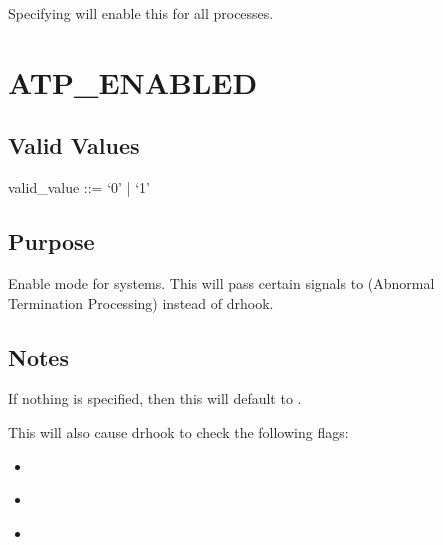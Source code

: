\documentclass[letterpaper,10pt,english]{sphinxmanual}
\begin{document}
\sphinxAtStartPar
Specifying  will enable this for all processes.


\section{ATP\_ENABLED}
\label{\detokenize{flag/flag:atp-enabled}}\label{\detokenize{flag/flag:id39}}

\subsection{Valid Values}
\label{\detokenize{flag/flag:id40}}
\begin{DUlineblock}{0em}
\item[] valid\_value ::= ‘0’ | ‘1’
\end{DUlineblock}


\subsection{Purpose}
\label{\detokenize{flag/flag:id41}}
\sphinxAtStartPar
Enable  mode for  systems. This will pass certain signals to  (Abnormal Termination Processing) instead of drhook.


\subsection{Notes}
\label{\detokenize{flag/flag:id42}}
\sphinxAtStartPar
If nothing is specified, then this will default to .

\sphinxAtStartPar
This will also cause drhook to check the following flags:
\begin{itemize}
\item {} 
\sphinxAtStartPar
{\hyperref[\detokenize{flag/flag:atp-max-cores}]{}}

\item {} 
\sphinxAtStartPar
{\hyperref[\detokenize{flag/flag:atp-max-analysis-time}]{}}

\item {} 
\sphinxAtStartPar
{\hyperref[\detokenize{flag/flag:atp-ignore-sigterm}]{}}

\end{itemize}
\end{document}

